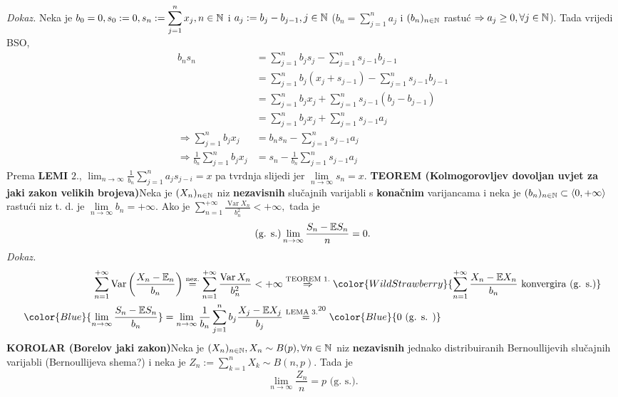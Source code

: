 \documentclass{article}
\newcommand{\Var}{\operatorname{Var}}
\begin{document}
\textit{Dokaz.}\newline
Neka je \(b_0=0,s_0:=0,\displaystyle s_n:=\sum_{j=1}^nx_j,n\in\Bbb N\) i \(a_j:=b_j-b_{j-1},j\in\Bbb N\) (\(b_n=\sum_{j=1}^na_j\) i \((b_n)_{n\in\Bbb N}\) rastuć \(\Rightarrow a_j\ge0,\forall j\in\Bbb N\)). Tada vrijedi BSO,\[\begin{aligned}b_ns_n&=\sum_{j=1}^nb_js_j-\sum_{j=1}^ns_{j-1}b_{j-1}\\&=\sum_{j=1}^nb_j(x_j+s_{j-1})-\sum_{j=1}^ns_{j-1}b_{j-1}\\&=\sum_{j=1}^nb_jx_j+\sum_{j=1}^ns_{j-1}(b_j-b_{j-1})\\&=\sum_{j=1}^nb_jx_j+\sum_{j=1}^ns_{j-1}a_j\\\Rightarrow\sum_{j=1}^nb_jx_j&=b_ns_n-\sum_{j=1}^ns_{j-1}a_j\\\Rightarrow\frac1{b_n}\sum_{j=1}^nb_jx_j&=s_n-\frac1{b_n}\sum_{j=1}^ns_{j-1}a_j\end{aligned}\] Prema \textbf{LEMI} \(2.\), \(\displaystyle\lim_{n\to\infty}\frac1{b_n}\sum_{j=1}^na_js_{j-i}=x\) pa tvrdnja slijedi jer \(\lim\limits_{n\to\infty}s_n=x.\)\newpage
\textbf{TEOREM (Kolmogorovljev dovoljan uvjet za jaki zakon velikih brojeva)}\newline Neka je \((X_n)_{n\in\Bbb N}\) niz \textbf{nezavisnih} slučajnih varijabli s \textbf{konačnim} varijancama i neka je \((b_n)_{n\in\Bbb N}\subset\langle 0,+\infty\rangle\) rastući niz t. d. je \(\lim\limits_{n\to\infty}b_n=+\infty.\) Ako je \(\displaystyle\sum_{n=1}^{+\infty}\frac{\Var X_n}{b_n^2}<+\infty,\) tada je \[\text{(g. s.)}\lim_{n\to\infty}\frac{S_n-\Bbb ES_n}n=0.\]
\textit{Dokaz.}\newline
\[\begin{aligned}\sum_{n=1}^{+\infty}\Var \left(\frac{X_n-\Bbb E_n}{b_n}\right)\overset{\text{nez.}}{=}\sum_{n=1}^{+\infty}\frac{\Var X_n}{b_n^2}<+\infty&\overset{\text{TEOREM }1.}{\Rightarrow}{\color{WildStrawberry}{\sum_{n=1}^{+\infty}\frac{X_n-\Bbb EX_n}{b_n}\text{ konvergira (g. s.)}}}\\{\color{Blue}{\lim_{n\to\infty}\frac{S_n-\Bbb ES_n}{b_n}}}=\lim_{n\to\infty}\frac1{b_n}\sum_{j=1}^nb_j\frac{X_j-\Bbb EX_j}{b_j}&\overset{\text{LEMA }3.\footnotemark[20]}{=}{\color{Blue}{0\text{ (g. s. )}}}\end{aligned}\] 
\textbf{KOROLAR (Borelov jaki zakon)}\newline Neka je \((X_n)_{n\in\Bbb N},X_n\sim B(p),\forall n\in\Bbb N\) niz \textbf{nezavisnih} jednako distribuiranih Bernoullijevih slučajnih varijabli (Bernoullijeva shema?) i neka je \(Z_n:=\sum_{k=1}^nX_k\sim B(n,p).\) Tada je \[\lim_{n\to\infty}\frac{Z_n}n=p\text{ (g. s.)}.\] 
\end{document}
